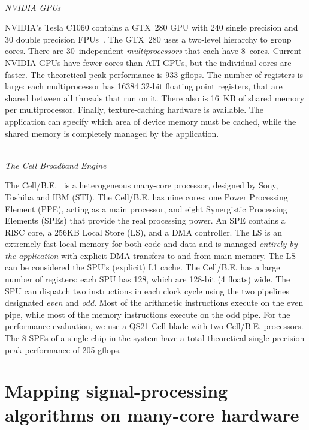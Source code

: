 \documentclass{article}
\begin{document}
\noindent \\ \emph{NVIDIA GPUs}

\noindent NVIDIA's Tesla C1060 contains a GTX~280 GPU with 240 single
precision and 30 double precision FPUs~\cite{cuda-manual}. The GTX~280
uses a two-level hierarchy to group cores.  There are 30~independent
\emph{multiprocessors\/} that each have 8~cores.  Current NVIDIA GPUs
have fewer cores than ATI GPUs, but the individual cores are faster.
The theoretical peak performance is 933 gflops.  The number of
registers is large: each multiprocessor has 16384 32-bit floating point registers,
that are shared between all threads that run on it.
There also is 16~KB of shared memory per
multiprocessor.  Finally, texture-caching hardware
is available.  The application can specify which area of device memory
must be cached, while the shared memory is completely managed by the
application.



\noindent \\ \emph{The Cell Broadband Engine}

\noindent The \mbox{Cell/B.E.}~\cite{cell} is a
heterogeneous many-core processor, designed by Sony, Toshiba and IBM
(STI).  The \mbox{Cell/B.E.} has nine cores: one Power Processing
Element (PPE), acting as a main processor, and eight Synergistic
Processing Elements (SPEs) that provide the real processing power.
An SPE contains
a RISC core, a 256KB Local Store (LS), and a DMA controller.
The LS is an extremely fast local memory for both code and data
and is managed \emph{entirely by the application} with explicit DMA
transfers to and from main memory.  The LS can be considered the SPU's (explicit) L1 cache.  The
\mbox{Cell/B.E.} has a large number of registers: each SPU has 128,
which are 128-bit (4 floats) wide.
 The SPU can dispatch two
instructions in each clock cycle using the two pipelines designated
\emph{even} and \emph{odd}. Most of the arithmetic instructions
execute on the even pipe, while most of the memory instructions
execute on the odd pipe. 
For the performance evaluation, we use a QS21 Cell blade with two
\mbox{Cell/B.E.} processors.
The 8 SPEs of a single chip in the
system have a total theoretical single-precision peak performance of
205 gflops.


\section{Mapping signal-processing algorithms on many-core hardware}
\end{document}
